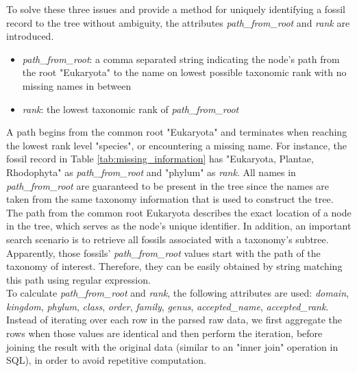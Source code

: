 \documentclass[11pt, a4paper,oneside,chapterprefix=false]{scrbook}
\begin{document}
To solve these three issues and provide a method for uniquely identifying a fossil record to the tree without ambiguity, the attributes \emph{path\_from\_root} and \emph{rank} are introduced. 

\begin{itemize}
	\item \textit{path\_from\_root}: a comma separated string indicating the node's path from the root "Eukaryota" to the name on lowest possible taxonomic rank with no missing names in between
	\item \textit{rank}: the lowest taxonomic rank of \textit{path\_from\_root}
\end{itemize}

A path begins from the common root "Eukaryota" and terminates when reaching the lowest rank level "species", or encountering a missing name. For instance, the fossil record in Table \ref{tab:missing_information} has "Eukaryota, Plantae, Rhodophyta" as \emph{path\_from\_root} and "phylum" as \emph{rank}. All names in \emph{path\_from\_root} are guaranteed to be present in the tree since the names are taken from the same taxonomy information that is used to construct the tree. The path from the common root Eukaryota describes the exact location of a node in the tree, which serves as the node's unique identifier. In addition, an important search scenario is to retrieve all fossils associated with a taxonomy's subtree. Apparently, those fossils' \emph{path\_from\_root} values start with the path of the taxonomy of interest. Therefore, they can be easily obtained by string matching this path using regular expression. \\

To calculate \emph{path\_from\_root} and \emph{rank}, the following attributes are used:  \emph{domain}, \emph{kingdom}, \emph{phylum}, \emph{class}, \emph{order}, \emph{family}, \emph{genus}, \emph{accepted\_name}, \emph{accepted\_rank}. Instead of iterating over each row in the parsed raw data, we first aggregate the rows when those values are identical and then perform the iteration, before joining the result with the original data (similar to an "inner join" operation in SQL), in order to avoid repetitive computation. \\
\end{document}
